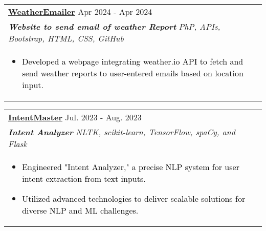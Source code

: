 \documentclass[a4paper,8pt]{article}
\begin{document}
\begin{tabularx}{\linewidth}{ @{}l r@{} }

\color[HTML]{1C033C} \textbf{\uline{\href{https://github.com/Himanshiprajapati/MyTube}{WeatherEmailer}}} \hfill \color[HTML]{371e77} Apr 2024 - Apr 2024\\[4pt]
\color[HTML]{371e77}\textbf{\textit{Website to send email of weather Report }} \hfill \color[HTML]{4B28A4} \textit{PhP, APIs, Bootstrap, HTML, CSS, GitHub}\\[5pt]
\begin{minipage}[t]{\linewidth}
    \begin{itemize}[nosep,after=\strut, leftmargin=2em, itemsep=2pt]
        
        \item \textcolor{black} {Developed a webpage integrating weather.io API to fetch and send weather reports to user-entered emails based on location input.}
    \end{itemize}
    \end{minipage}\end{tabularx}
\begin{tabularx}{\linewidth}{ @{}l r@{} }
    
\color[HTML]{1C033C} \textbf{\uline{\href{https://github.com/Himanshiprajapati/InternMaster}{IntentMaster}}} \hfill \color[HTML]{371e77} Jul. 2023 - Aug. 2023\\[4pt]
\color[HTML]{371e77}\textbf{\textit{Intent Analyzer }} \hfill \color[HTML]{4B28A4} \textit{NLTK, scikit-learn, TensorFlow, spaCy, and Flask}\\[5pt]
\begin{minipage}[t]{\linewidth}
    \begin{itemize}[nosep,after=\strut, leftmargin=2em, itemsep=2pt]
        \item  \textcolor{black} {Engineered "Intent Analyzer," a precise NLP system for user intent extraction from text inputs.}


        \item \textcolor{black} { Utilized advanced technologies to deliver scalable solutions for diverse NLP and ML challenges.}
    \end{itemize}
    \end{minipage}\end{tabularx}
    
\end{document}
